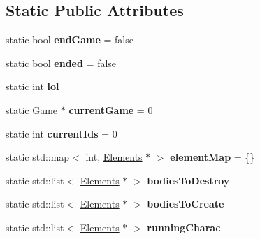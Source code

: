 \subsection*{Static Public Attributes}
\begin{DoxyCompactItemize}
\item 
\hypertarget{class_game_a6f05b1c88b1086147854b72defced72a}{static bool {\bfseries end\+Game} = false}\label{class_game_a6f05b1c88b1086147854b72defced72a}

\item 
\hypertarget{class_game_aa7b98d72784b65dbef9070b638542b05}{static bool {\bfseries ended} = false}\label{class_game_aa7b98d72784b65dbef9070b638542b05}

\item 
\hypertarget{class_game_ac52883575849c7580b0b9dba48aef174}{static int {\bfseries lol}}\label{class_game_ac52883575849c7580b0b9dba48aef174}

\item 
\hypertarget{class_game_a39d21390b44ce5827d08ca4ccd9c108a}{static \hyperlink{class_game}{Game} $\ast$ {\bfseries current\+Game} = 0}\label{class_game_a39d21390b44ce5827d08ca4ccd9c108a}

\item 
\hypertarget{class_game_ae5bfa29230411c2605787261070909e6}{static int {\bfseries current\+Ids} = 0}\label{class_game_ae5bfa29230411c2605787261070909e6}

\item 
\hypertarget{class_game_a88aa459a01bbc438e665a19c53732c0e}{static std\+::map$<$ int, \hyperlink{class_elements}{Elements} $\ast$ $>$ {\bfseries element\+Map} = \{\}}\label{class_game_a88aa459a01bbc438e665a19c53732c0e}

\item 
\hypertarget{class_game_a078c48086258daf73a89bf4bde485969}{static std\+::list$<$ \hyperlink{class_elements}{Elements} $\ast$ $>$ {\bfseries bodies\+To\+Destroy}}\label{class_game_a078c48086258daf73a89bf4bde485969}

\item 
\hypertarget{class_game_a04166a78d83b34000f7ab31d867fef27}{static std\+::list$<$ \hyperlink{class_elements}{Elements} $\ast$ $>$ {\bfseries bodies\+To\+Create}}\label{class_game_a04166a78d83b34000f7ab31d867fef27}

\item 
\hypertarget{class_game_a80912de3bec452b5a8df21650422d20a}{static std\+::list$<$ \hyperlink{class_elements}{Elements} $\ast$ $>$ {\bfseries running\+Charac}}\label{class_game_a80912de3bec452b5a8df21650422d20a}


\end{DoxyCompactItemize}
